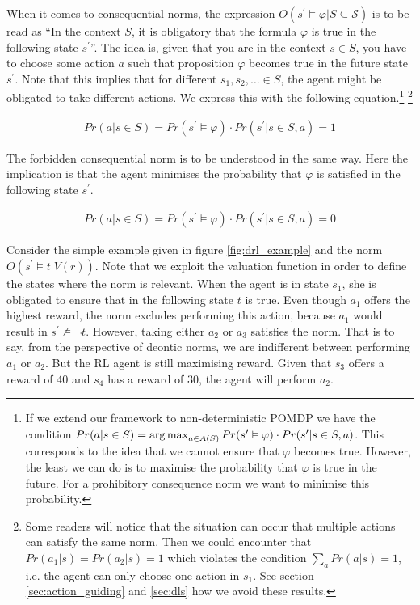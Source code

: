 When it comes to consequential norms, the expression $O(s^{\prime} \vDash \varphi|S \subseteq \mathcal{S})$ is to be read as ``In the context $S$, it is obligatory that the formula $\varphi$ is true in the following state $s^{\prime}$''. The idea is, given that you are in the context $s \in S$, you have to choose some action $a$ such that proposition $\varphi$ becomes true in the future state $s^{\prime}$. Note that this implies that for different $s_1, s_2, \ldots \in S$, the agent might be obligated to take different actions. We express this with the following equation.\footnote{If we extend our framework to non-deterministic POMDP we have the condition ${Pr(a | s \in S) = \operatorname*{arg\,max}_{a \in A(S)} Pr(s^{\prime} \vDash \varphi) \cdot Pr(s^{\prime} | s \in S,a)}$. This corresponds to the idea that we cannot ensure that $\varphi$ becomes true. However, the least we can do is to maximise the probability that $\varphi$ is true in the future. For a prohibitory consequence norm we want to minimise this probability.} \footnote{Some readers will notice that the situation can occur that multiple actions can satisfy the same norm. Then we could encounter that {$Pr(a_1 | s) = Pr(a_2 | s) = 1$} which violates the condition $\sum_a Pr(a | s) = 1$, i.e. the agent can only choose one action in $s_1$. See section \ref{sec:action_guiding} and \ref{sec:dls} how we avoid these results.}

\begin{align}
	Pr(a | s \in S) = Pr(s^{\prime} \vDash \varphi) \cdot Pr(s^{\prime} | s \in S,a) = 1
\end{align}

The forbidden consequential norm is to be understood in the same way. Here the implication is that the agent minimises the probability that $\varphi$ is satisfied in the following state $s^{\prime}$. 

\begin{align}
	Pr(a | s \in S) = Pr(s^{\prime} \vDash \varphi) \cdot Pr(s^{\prime} | s \in S,a) = 0
\end{align}

Consider the simple example given in figure \ref{fig:drl_example} and the norm ${O(s^{\prime} \vDash t | V(r))}$. Note that we exploit the valuation function in order to define the states where the norm is relevant. When the agent is in state $s_1$, she is obligated to ensure that in the following state $t$ is true. Even though $a_1$ offers the highest reward, the norm excludes performing this action, because $a_1$ would result in $s^{\prime} \nvDash \neg t$. However, taking either $a_2$ or $a_3$ satisfies the norm. That is to say, from the perspective of deontic norms, we are indifferent between performing $a_1$ or $a_2$. But the RL agent is still maximising reward. Given that $s_3$ offers a reward of $40$ and $s_4$ has a reward of $30$, the agent will perform $a_2$. 

